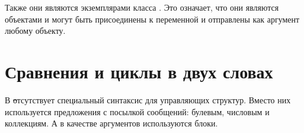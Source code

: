 \documentclass[a4paper,10pt,twoside]{book}
\begin{document}
Также они являются экземплярами класса .
Это означает, что они являются объектами и могут быть присоединены к переменной и отправлены как аргумент любому объекту.







\section{Сравнения и циклы в двух словах}


В \st отсутствует специальный синтаксис для управляющих структур.
Вместо них используется предложения с посылкой сообщений: булевым, числовым и коллекциям.
А в качестве аргументов используются блоки.

\end{document}

